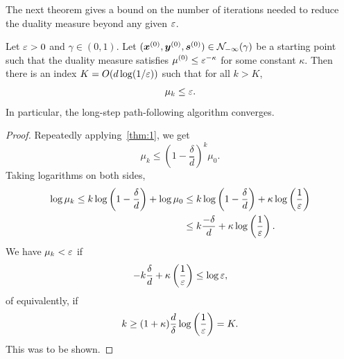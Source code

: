 The next theorem gives a bound on the number of iterations needed to reduce the duality measure beyond any given $\varepsilon$.

\begin{theorem}
 Let $\varepsilon>0$ and $\gamma\in (0,1)$. Let $(\bm{x}^{(0)},\bm{y}^{(0)},\bm{s}^{(0)})\in \mathcal{N}_{-\infty}(\gamma)$ be a starting point such that the duality measure satisfies $\mu^{(0)}\leq \varepsilon^{-\kappa}$ for some constant $\kappa$. Then there is an index $K=O(d\log (1/\varepsilon))$ such that for all $k>K$,
 \begin{equation*}
  \mu_k \leq \varepsilon.
 \end{equation*}
In particular, the long-step path-following algorithm converges.
\end{theorem}

\begin{proof}
Repeatedly applying~\eqref{thm:1}, we get
\begin{equation*}
 \mu_{k} \leq \left(1-\frac{\delta}{d}\right)^k \mu_0.
\end{equation*}
Taking logarithms on both sides,
 \begin{align*}
  \log \mu_{k}\leq k \log\left(1-\frac{\delta}{d}\right)+\log \mu_0 
  &\leq k \log\left(1-\frac{\delta}{d}\right)+\kappa \log\left(\frac{1}{\varepsilon}\right)\\
  &\leq k\frac{-\delta}{d}+\kappa\log\left(\frac{1}{\varepsilon}\right).
 \end{align*}
We have $\mu_k<\varepsilon$ if 
\begin{equation*}
 -k\frac{\delta}{d}+\kappa \left(\frac{1}{\varepsilon}\right) \leq \log \varepsilon,
\end{equation*}
of equivalently, if 
\begin{equation*}
 k\geq (1+\kappa)\frac{d}{\delta}\log\left(\frac{1}{\varepsilon}\right)=K.
\end{equation*}
This was to be shown.

\end{proof}



